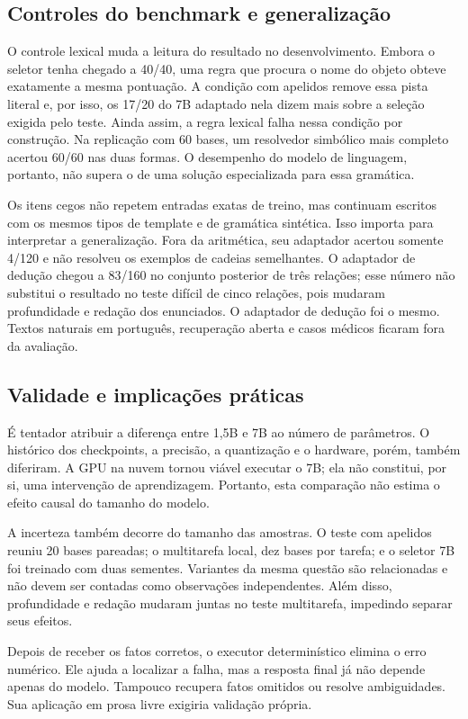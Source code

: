 \documentclass[12pt,a4paper]{article}
\begin{document}
\subsection{Controles do benchmark e generalização}
O controle lexical muda a leitura do resultado no desenvolvimento. Embora o seletor tenha chegado a 40/40, uma regra que procura o nome do objeto obteve exatamente a mesma pontuação. A condição com apelidos remove essa pista literal e, por isso, os 17/20 do 7B adaptado nela dizem mais sobre a seleção exigida pelo teste. Ainda assim, a regra lexical falha nessa condição por construção. Na replicação com 60 bases, um resolvedor simbólico mais completo acertou 60/60 nas duas formas. O desempenho do modelo de linguagem, portanto, não supera o de uma solução especializada para essa gramática.

Os itens cegos não repetem entradas exatas de treino, mas continuam escritos com os mesmos tipos de template e de gramática sintética. Isso importa para interpretar a generalização. Fora da aritmética, seu adaptador acertou somente 4/120 e não resolveu os exemplos de cadeias semelhantes. O adaptador de dedução chegou a 83/160 no conjunto posterior de três relações; esse número não substitui o resultado no teste difícil de cinco relações, pois mudaram profundidade e redação dos enunciados. O adaptador de dedução foi o mesmo. Textos naturais em português, recuperação aberta e casos médicos ficaram fora da avaliação.

\subsection{Validade e implicações práticas}
É tentador atribuir a diferença entre 1,5B e 7B ao número de parâmetros. O histórico dos checkpoints, a precisão, a quantização e o hardware, porém, também diferiram. A GPU na nuvem tornou viável executar o 7B; ela não constitui, por si, uma intervenção de aprendizagem. Portanto, esta comparação não estima o efeito causal do tamanho do modelo.

A incerteza também decorre do tamanho das amostras. O teste com apelidos reuniu 20 bases pareadas; o multitarefa local, dez bases por tarefa; e o seletor 7B foi treinado com duas sementes. Variantes da mesma questão são relacionadas e não devem ser contadas como observações independentes. Além disso, profundidade e redação mudaram juntas no teste multitarefa, impedindo separar seus efeitos.

Depois de receber os fatos corretos, o executor determinístico elimina o erro numérico. Ele ajuda a localizar a falha, mas a resposta final já não depende apenas do modelo. Tampouco recupera fatos omitidos ou resolve ambiguidades. Sua aplicação em prosa livre exigiria validação própria.
\end{document}
